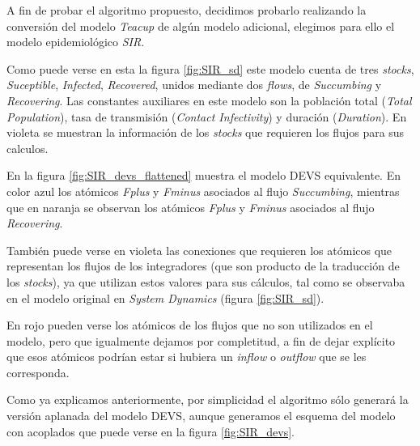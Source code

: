 
A fin de probar el algoritmo propuesto, decidimos probarlo realizando la conversión del modelo \textit{Teacup} de algún modelo adicional, elegimos para ello el modelo epidemiológico \textit{SIR}.

Como puede verse en esta la figura \ref{fig:SIR_sd} este modelo cuenta de tres \textit{stocks}, \textit{Suceptible}, \textit{Infected}, \textit{Recovered}, unidos mediante dos \textit{flows}, de  \textit{Succumbing} y \textit{Recovering}. Las constantes auxiliares en este modelo son la población total (\textit{Total Population}), tasa de transmisión (\textit{Contact Infectivity}) y duración (\textit{Duration}). En violeta se muestran la información de los \textit{stocks} que requieren los flujos para sus calculos.

En la figura \ref{fig:SIR_devs_flattened} muestra el modelo DEVS equivalente. En color azul los atómicos \textit{Fplus} y \textit{Fminus} asociados al flujo \textit{Succumbing}, mientras que en naranja se observan los atómicos \textit{Fplus} y \textit{Fminus} asociados al flujo \textit{Recovering}. 

También puede verse en violeta  las conexiones que requieren los atómicos que representan los flujos de los integradores (que son producto de la traducción de los \textit{stocks}), ya que utilizan estos valores para sus cálculos, tal como se observaba en el modelo original en \textit{System Dynamics} (figura \ref{fig:SIR_sd}). 

En rojo pueden verse los atómicos de los flujos que no son utilizados en el modelo, pero que igualmente dejamos por completitud, a fin de dejar explícito que esos atómicos podrían estar si hubiera un \textit{inflow} o \textit{outflow} que se les corresponda.

Como ya explicamos anteriormente, por simplicidad el algoritmo sólo generará la versión aplanada del modelo DEVS, aunque generamos el esquema del modelo con acoplados que puede verse en la figura \ref{fig:SIR_devs}.


